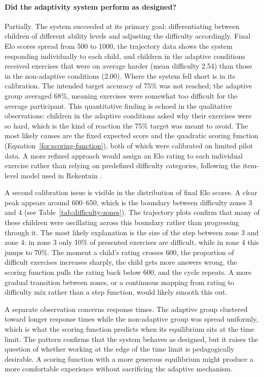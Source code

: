 \paragraph{Did the adaptivity system perform as designed?}
Partially. The system succeeded at its primary goal: differentiating between children of different ability levels and adjusting the difficulty accordingly. Final Elo scores spread from 500 to 1000, the trajectory data shows the system responding individually to each child, and children in the adaptive conditions received exercises that were on average harder (mean difficulty 2.54) than those in the non-adaptive conditions (2.00). Where the system fell short is in its calibration. The intended target accuracy of 75\% was not reached; the adaptive group averaged 68\%, meaning exercises were somewhat too difficult for the average participant. This quantitative finding is echoed in the qualitative observations: children in the adaptive conditions asked why their exercises were so hard, which is the kind of reaction the 75\% target was meant to avoid. The most likely causes are the fixed expected score and the quadratic scoring function (Equation~\ref{for:scoring-function}), both of which were calibrated on limited pilot data. A more refined approach would assign an Elo rating to each individual exercise rather than relying on predefined difficulty categories, following the item-level model used in Rekentuin \cite{klinkenberg2011computer}.

A second calibration issue is visible in the distribution of final Elo scores. A clear peak appears around 600--650, which is the boundary between difficulty zones 3 and 4 (see Table~\ref{tab:difficulty-zones}). The trajectory plots confirm that many of these children were oscillating across this boundary rather than progressing through it. The most likely explanation is the size of the step between zone 3 and zone 4: in zone 3 only 10\% of presented exercises are difficult, while in zone 4 this jumps to 70\%. The moment a child's rating crosses 600, the proportion of difficult exercises increases sharply, the child gets more answers wrong, the scoring function pulls the rating back below 600, and the cycle repeats. A more gradual transition between zones, or a continuous mapping from rating to difficulty mix rather than a step function, would likely smooth this out.

A separate observation concerns response times. The adaptive group clustered toward longer response times while the non-adaptive group was spread uniformly, which is what the scoring function predicts when its equilibrium sits at the time limit. The pattern confirms that the system behaves as designed, but it raises the question of whether working at the edge of the time limit is pedagogically desirable. A scoring function with a more generous equilibrium might produce a more comfortable experience without sacrificing the adaptive mechanism.

